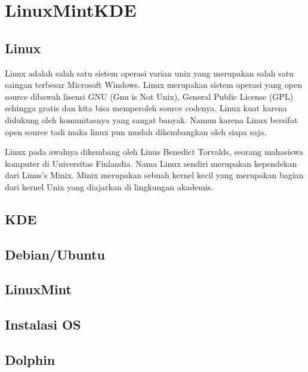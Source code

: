 \documentclass[11pt,fleqn]{book} %
\begin{document}
\newpage
{} %
\chapter{LinuxMintKDE}
\section{Linux}
\begin{flushleft}
\hspace{10pt}Linux adalah salah satu sistem operasi varian unix yang merupakan salah satu saingan terbesar Microsoft Windows. 
Linux merupakan sistem operasi yang open source dibawah lisensi GNU (Gnu is Not Unix), General Public License (GPL) sehingga gratis dan kita bisa memperoleh source codenya. 
Linux kuat karena didukung oleh komunitasnya yang sangat banyak.
Namun karena Linux bersifat open source tadi maka linux pun mudah dikembangkan oleh siapa saja.

\hspace{10pt}Linux pada awalnya dikembang oleh Linus Benedict Torvalds, seorang mahasiswa komputer di Universitas Finlandia.
Nama Linux sendiri merupakan kependekan dari Linus's Minix.
Minix merupakan sebuah kernel kecil yang merupakan bagian dari kernel Unix yang diajarkan di lingkungan akademis.
\end{flushleft}
\section{KDE}
\section{Debian/Ubuntu}
\section{LinuxMint}
\section{Instalasi OS}
\section{Dolphin}
\end{document}
